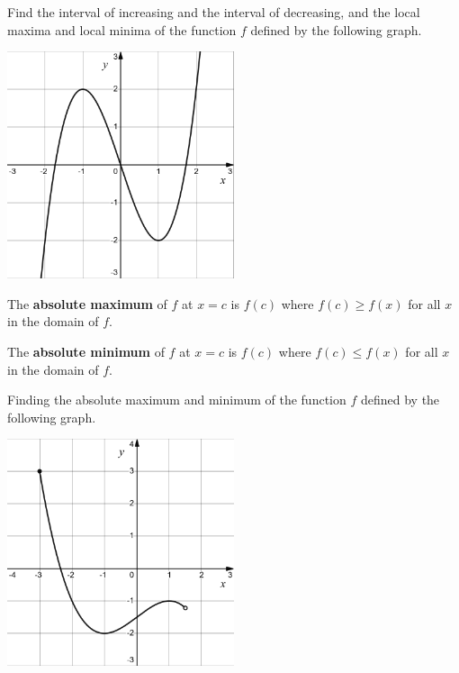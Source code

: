 \begin{example}
  Find the interval of increasing and the interval of decreasing, and the local maxima and local minima of the function $f$ defined by the following graph.
  \begin{center}
    \raggedright\includegraphics[width=0.5\textwidth]{figs/x^3-3x.png}
  \end{center}
\end{example}

\newpage

\begin{definition}
  The \textbf{absolute maximum} of $f$ at \(x=c\) is \(f(c)\) where \(f(c)\ge f(x)\) for all \(x\) in the domain of \(f\).
  
  The \textbf{absolute minimum} of $f$ at \(x=c\) is \(f(c)\) where \(f(c)\le f(x)\) for all \(x\) in the domain of \(f\).
\end{definition}

\begin{example}
  Finding the absolute maximum and minimum of the function $f$ defined by the following graph.
  
  \begin{center}
    \raggedright\includegraphics[width=0.5\textwidth]{figs/(-x^3+3x-6)divby4.png}
  \end{center}
\end{example}

